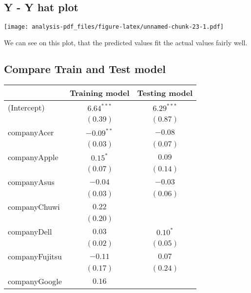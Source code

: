 \documentclass[
]{article}
\begin{document}
\hypertarget{y---y-hat-plot}{%
\subsection{Y - Y hat plot}\label{y---y-hat-plot}}

\texttt{[image: analysis-pdf\_files/figure-latex/unnamed-chunk-23-1.pdf]}

We can see on this plot, that the predicted values fit the actual values
fairly well.

\hypertarget{compare-train-and-test-model}{%
\subsection{Compare Train and Test
model}\label{compare-train-and-test-model}}

\begin{table}
\begin{center}
\begin{tabular}{l c c}
\hline
 & Training model & Testing model \\
\hline
(Intercept)                   & $6.64^{***}$  & $6.29^{***}$  \\
                              & $(0.39)$      & $(0.87)$      \\
companyAcer                   & $-0.09^{**}$  & $-0.08$       \\
                              & $(0.03)$      & $(0.07)$      \\
companyApple                  & $0.15^{*}$    & $0.09$        \\
                              & $(0.07)$      & $(0.14)$      \\
companyAsus                   & $-0.04$       & $-0.03$       \\
                              & $(0.03)$      & $(0.06)$      \\
companyChuwi                  & $0.22$        &               \\
                              & $(0.20)$      &               \\
companyDell                   & $0.03$        & $0.10^{*}$    \\
                              & $(0.02)$      & $(0.05)$      \\
companyFujitsu                & $-0.11$       & $0.07$        \\
                              & $(0.17)$      & $(0.24)$      \\
companyGoogle                 & $0.16$        &               \\

\end{tabular}
\end{center}
\end{table}
\end{document}
